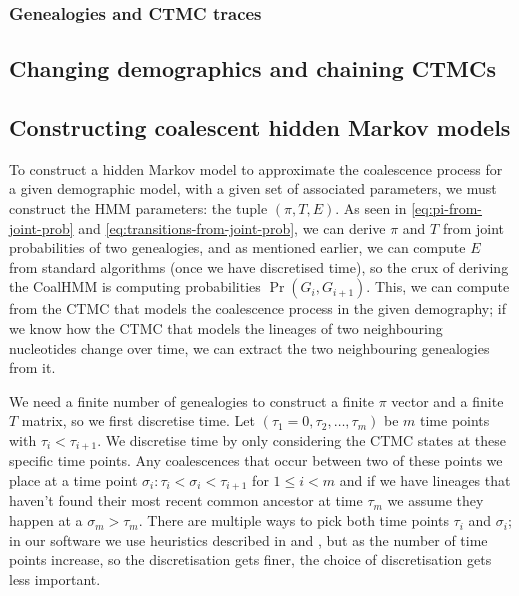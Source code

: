 \documentclass[graybox]{svmult}
\newcommand{\T}{\ensuremath{T}}
\renewcommand{\E}{\ensuremath{E}}
\begin{document}
\subsubsection{Genealogies and CTMC traces}



\subsection{Changing demographics and chaining CTMCs}

\subsection{Constructing coalescent hidden Markov models}


To construct a hidden Markov model to approximate the coalescence process for a given demographic model, with a given set of associated parameters, we must construct the HMM parameters: the tuple $(\pi,\T,\E)$. As seen in \eqref{eq:pi-from-joint-prob} and \eqref{eq:transitions-from-joint-prob}, we can derive $\pi$ and $\T$ from joint probabilities of two genealogies, and as mentioned earlier, we can compute $\E$ from standard algorithms (once we have discretised time), so the crux of deriving the CoalHMM is computing probabilities $\Pr(G_i,G_{i+1})$. This, we can compute from the CTMC that models the coalescence process in the given demography; if we know how the CTMC that models the lineages of two neighbouring nucleotides change over time, we can extract the two neighbouring genealogies from it.

We need a finite number of genealogies to construct a finite $\pi$ vector and a finite $\T$ matrix, so we first discretise time. Let $(\tau_1=0,\tau_2,\ldots,\tau_m)$ be $m$ time points with $\tau_i<\tau_{i+1}$. We discretise time by only considering the CTMC states at these specific time points. Any coalescences that occur between two of these points we place at a time point $\sigma_i: \tau_i < \sigma_i < \tau_{i+1}$ for $1 \leq i < m$ and if we have lineages that haven't found their most recent common ancestor at time $\tau_{m}$ we assume they happen at a $\sigma_m > \tau_m$. There are multiple ways to pick both time points $\tau_i$ and $\sigma_i$; in our software we use heuristics described in \citet{Mailund:2011dva} and \cite{Mailund:2012ewa}, but as the number of time points increase, so the discretisation gets finer, the choice of discretisation gets less important.
\end{document}

